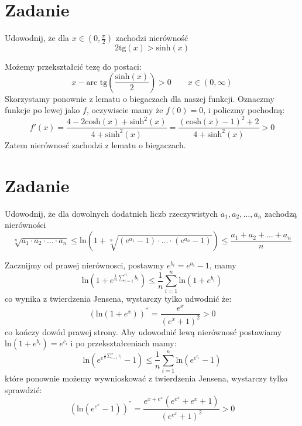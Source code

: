 \documentclass[12pt]{scrartcl}
\begin{document}
\section{Zadanie}
    
    \begin{zadanie}
        Udowodnij, że dla $x \in \left ( 0, \frac{\pi }{2} \right )$ zachodzi nierówność
        \[
            2 \text{tg} \left ( x \right ) > \text{sinh} \left ( x \right ) 
        \]
        
    \end{zadanie}

    Możemy przekształcić tezę do postaci:
    \[
        x - \text{arc tg} \left ( \frac{\text{sinh} \left ( x\right ) }{2} \right ) > 0 \qquad x \in (0, \infty )
    \]
    Skorzystamy ponownie z lematu o biegaczach dla naszej funkcji. Oznaczmy funkcje po lewej jako $f$, oczywiscie mamy że $f(0) = 0$, i policzmy pochodną:
    \[
        f'(x) = \frac{4 - 2 \text{cosh} \left ( x \right ) + \text{sinh}^2 \left ( x \right )  }{4 + \text{sinh}^2 \left ( x \right ) } = \frac{\left ( \text{cosh} \left ( x \right ) - 1  \right )^2 + 2}{4 + \text{sinh}^2 \left ( x \right ) } > 0
    \]
    Zatem nierównosć zachodzi z lematu o biegaczach.
    
\section{Zadanie}
    
    \begin{zadanie}
        Udowodnij, że dla dowolnych dodatnich liczb rzeczywistych $a_{1}, a_{2}, \dots , a_n$ zachodzą nierówności
        \[
          \sqrt[n]{a_{1} \cdot a_{2} \cdot \dots \cdot a_n} \leq \text{ln} \left ( 1 + \sqrt[n]{\left ( e^{a_1} - 1 \right ) \cdot \dots \cdot \left ( e^{a_n} - 1 \right )}  \right ) \leq \frac{a_{1} + a_{2} + \dots + a_n}{n}
        \]
         
    \end{zadanie}

    Zacznijmy od prawej nierównosci, postawmy $e^{b_i} = e^{a_i} - 1$, mamy 
    \[
      \text{ln} \left ( 1 + e^{\frac{1}{n} \sum_{i = 1}^{n} b_i } \right ) \leq \frac{1}{n} \sum_{i = 1}^{n} \text{ln} \left ( 1 + e^{b_i} \right )  
    \]
   co wynika z twierdzenia Jensena, wystarczy tylko udwodnić że:
   \[
       \left ( \text{ln} \left ( 1 + e^x \right )  \right )^{''} = \frac{e^x}{(e^x + 1)^2} > 0
   \]
   co kończy dowód prawej strony.
   Aby udowodnić lewą nierównosć postawiamy $\text{ln} \left ( 1 + e^{b_i} \right ) = e^{c_i} $ i po przekształceniach mamy:
   \[
     \text{ln} \left ( e^{e^{\frac{1}{n} \sum_{i = 1}^{n} c_i }} - 1 \right ) \leq \frac{1}{n} \sum_{i = 1}^{n} \text{ln} \left ( e^{e^{c_i}} - 1 \right )  
   \]
   które ponownie możemy wywnioskować z twierdzenia Jensena, wystarczy tylko sprawdzić:
   \[
     \left ( \text{ln} \left ( e^{e^x} - 1 \right )  \right )^{''} = \frac{e^{x + e^x} \left ( e^{e^x} + e^x + 1 \right )}{\left ( e^{e^x} + 1 \right )^2} > 0
   \]
   
    
\end{document}
